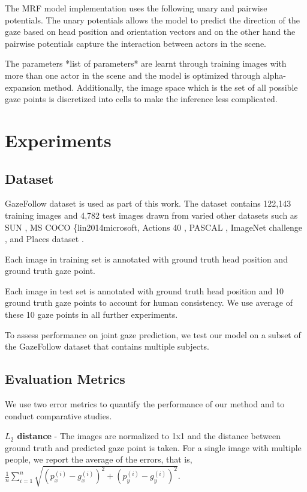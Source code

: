 \documentclass[10pt,twocolumn,letterpaper]{article}
\begin{document}
The MRF model implementation uses the following unary and pairwise potentials. The unary potentials allows the model to predict the direction of the gaze based on head position and orientation vectors and on the other hand the pairwise potentials capture the interaction between actors in the scene.

The parameters *list of parameters* are learnt through training images with more than one actor in the scene and the model is optimized through alpha-expansion method.
Additionally, the image space which is the set of all possible gaze points is discretized into cells to make the inference less complicated.

\section{Experiments}

\subsection{Dataset}

GazeFollow dataset \cite{nips15_recasens} is used as part of this work. The dataset contains 122,143 training images and 4,782 test images drawn from varied other datasets such as SUN \cite{xiao2010sun}, MS COCO \{lin2014microsoft, Actions 40 \cite{yao2011human}, PASCAL \cite{everingham2010pascal}, ImageNet challenge \cite{russakovsky2015imagenet}, and Places dataset \cite{zhou2014learning}.

Each image in training set is annotated with ground truth head position and ground truth gaze point.

Each image in test set is annotated with ground truth head position and 10 ground truth gaze points to account for human consistency. We use average of these 10 gaze points in all further experiments.

To assess performance on joint gaze prediction, we test our model on a subset of the GazeFollow dataset that contains multiple subjects.

\subsection{Evaluation Metrics}

We use two error metrics to quantify the performance of our method and to conduct comparative studies.

\textbf{$L_2$ distance} - The images are normalized to 1x1 and the distance between ground truth and predicted gaze point is taken. For a single image with multiple people, we report the average of the errors, that is, $\frac{1}{n} \sum_{i=1}^n \sqrt{(p_x^{(i)} - g_x^{(i)})^2 + (p_y^{(i)} - g_y^{(i)})^2}$. \\
\end{document}
